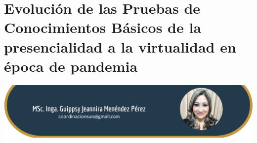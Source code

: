 \documentclass[12pt,spanish,Letterpaper,openany]{book}
\begin{document}
\hypertarget{guippsymenendez}{%
\chapter{Evolución de las Pruebas de Conocimientos Básicos de la presencialidad a la virtualidad en época de pandemia}\label{guippsymenendez}}

\begin{center}\includegraphics[width=1\linewidth]{images/gMenendez_image1} \end{center}
\end{document}
